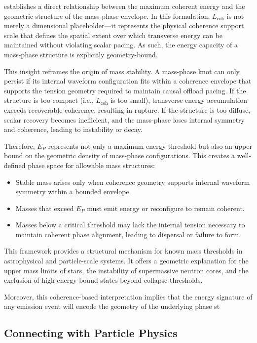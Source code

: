 \documentclass[entropy,article,submit,pdftex,moreauthors]{Definitions/mdpi}
\begin{document}
establishes a direct relationship between the maximum coherent energy and the geometric structure of the mass-phase envelope. In this formulation, $L_{\text{coh}}$ is not merely a dimensional placeholder—it represents the physical coherence support scale that defines the spatial extent over which transverse energy can be maintained without violating scalar pacing. As such, the energy capacity of a mass-phase structure is explicitly geometry-bound.

This insight reframes the origin of mass stability. A mass-phase knot can only persist if its internal waveform configuration fits within a coherence envelope that supports the tension geometry required to maintain causal offload pacing. If the structure is too compact (i.e., $L_{\text{coh}}$ is too small), transverse energy accumulation exceeds recoverable coherence, resulting in rupture. If the structure is too diffuse, scalar recovery becomes inefficient, and the mass-phase loses internal symmetry and coherence, leading to instability or decay.

Therefore, $E_P$ represents not only a maximum energy threshold but also an upper bound on the geometric density of mass-phase configurations. This creates a well-defined phase space for allowable mass structures:
\begin{itemize}
  \item Stable mass arises only when coherence geometry supports internal waveform symmetry within a bounded envelope.
  \item Masses that exceed $E_P$ must emit energy or reconfigure to remain coherent.
  \item Masses below a critical threshold may lack the internal tension necessary to maintain coherent phase alignment, leading to dispersal or failure to form.
\end{itemize}

This framework provides a structural mechanism for known mass thresholds in astrophysical and particle-scale systems. It offers a geometric explanation for the upper mass limits of stars, the instability of supermassive neutron cores, and the exclusion of high-energy bound states beyond collapse thresholds.

Moreover, this coherence-based interpretation implies that the energy signature of any emission event will encode the geometry of the underlying phase st
\subsection{Connecting with Particle Physics}
\end{document}
